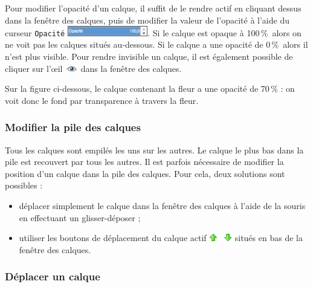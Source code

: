 Pour modifier l'opacité d'un calque, il suffit de le rendre actif en cliquant dessus dans la fenêtre des calques, puis de modifier la valeur de l'opacité à l'aide du curseur \texttt{Opacité} \includegraphics[width=3.5cm]{./images/image02/BarreOpacite}. Si le calque est opaque à 100\,\%\ alors on ne voit pas les calques situés au-dessous. Si le calque a une opacité de 0\,\%\, alors il n'est plus visible. Pour rendre invisible un calque, il est également possible de cliquer sur l'œil \includegraphics[width=.6cm]{./images/image02/iconeOeil} dans la fenêtre des calques.

Sur la figure ci-dessous, le calque contenant la fleur a une opacité de 70\,\% : on voit donc le fond par transparence à travers la fleur.  




\subsubsection{Modifier la pile des calques}\label{Gimp2CalquesOrdonner}

Tous les calques sont empilés les uns sur les autres. Le calque le plus bas dans la pile est recouvert par tous les autres. Il est parfois nécessaire de modifier la position d'un calque dans la pile des calques. Pour cela, deux solutions sont possibles :
\begin{itemize}
\item déplacer simplement le calque dans la fenêtre des calques à l'aide de la souris en effectuant un glisser-déposer ;
\item utiliser les boutons de déplacement du calque actif \includegraphics[width=1cm]{./images/image02/CalqueOrdonner} situés en bas de la fenêtre des calques.
\end{itemize}




\subsubsection{Déplacer un calque}\label{Gimp2CalquesDeplacer} 

